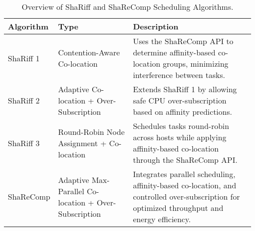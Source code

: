 \begin{table}[H]
    \centering
    \caption{Overview of ShaRiff and ShaReComp Scheduling Algorithms.}
    \label{tab:shariff_overview}
    \begin{tabularx}{\textwidth}{l l X}
        \toprule
        \textbf{Algorithm} & \textbf{Type}                                         & \textbf{Description}                                                                                                                         \\
        \midrule
        ShaRiff 1          & Contention-Aware Co-location                          & Uses the ShaReComp API to determine affinity-based co-location groups, minimizing interference between tasks.                                \\

        ShaRiff 2          & Adaptive Co-location + Over-Subscription              & Extends ShaRiff 1 by allowing safe CPU over-subscription based on affinity predictions.                                                      \\

        ShaRiff 3          & Round-Robin Node Assignment + Co-location             & Schedules tasks round-robin across hosts while applying affinity-based co-location through the ShaReComp API.                                \\

        ShaReComp          & Adaptive Max-Parallel Co-location + Over-Subscription & Integrates parallel scheduling, affinity-based co-location, and controlled over-subscription for optimized throughput and energy efficiency. \\
        \bottomrule
    \end{tabularx}
\end{table}


